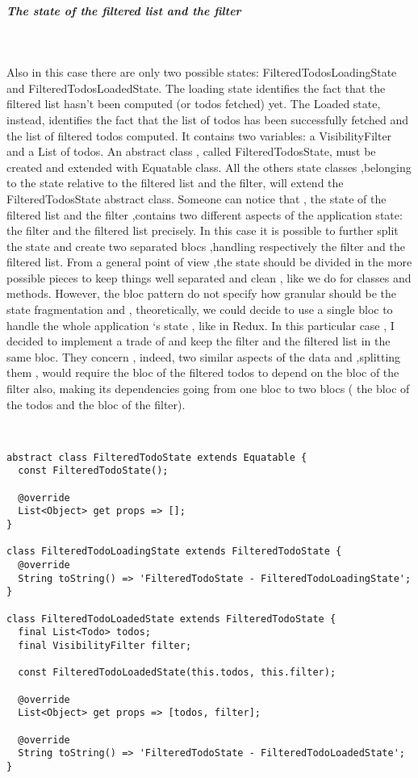 \subparagraph{The state of the filtered list and the filter }\mbox{}\\
\label{subpar:todo_app_bloc_core_state}

Also in this case there are only two possible states: FilteredTodosLoadingState and FilteredTodosLoadedState. The loading state identifies the fact that the filtered list hasn’t been computed (or todos fetched) yet. The Loaded state, instead,  identifies the fact that the list of todos has been successfully fetched and the list of filtered todos computed. It contains two variables: a VisibilityFilter and a List of todos. An abstract class , called FilteredTodosState, must be created and extended with Equatable class. All the others state classes ,belonging to the state relative to the filtered list and the filter, will extend the FilteredTodosState abstract class. Someone can notice that , the state of the filtered list and the filter ,contains two different aspects of the application state: the filter and the filtered list precisely. In this case it is possible to further split the state and create two separated blocs ,handling respectively the filter and the filtered list. From a general point of view ,the state should be divided in the more possible pieces to keep things well separated and clean , like we do for classes and methods. However, the bloc pattern do not specify how granular should be the state fragmentation and , theoretically, we could decide to use a single bloc to handle the whole application ‘s state , like in Redux. In this particular case , I decided to implement a trade of and keep the filter and the filtered list in the same bloc. They concern , indeed, two similar aspects of the data and ,splitting them , would require the bloc of the filtered todos to depend on the bloc of the filter also, making its dependencies  going from one bloc to two blocs ( the bloc of the todos and the bloc of the filter).
\begin{code}
\mbox{}\\
 \mbox{}
\label{code:2.14}
\begin{verbatim}
abstract class FilteredTodoState extends Equatable {
  const FilteredTodoState();

  @override
  List<Object> get props => [];
}

class FilteredTodoLoadingState extends FilteredTodoState {
  @override
  String toString() => 'FilteredTodoState - FilteredTodoLoadingState';
}

class FilteredTodoLoadedState extends FilteredTodoState {
  final List<Todo> todos;
  final VisibilityFilter filter;

  const FilteredTodoLoadedState(this.todos, this.filter);

  @override
  List<Object> get props => [todos, filter];

  @override
  String toString() => 'FilteredTodoState - FilteredTodoLoadedState';
}
\end{verbatim}
\mbox{}
\end{code}

